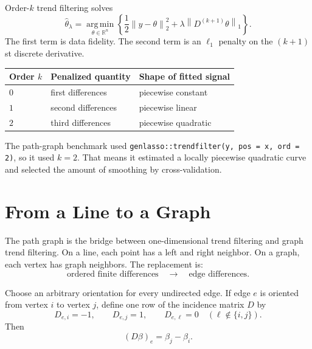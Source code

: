 \documentclass[11pt]{article}
\newcommand{\R}{\mathbb R}
\newcommand{\norm}[1]{\left\lVert #1 \right\rVert}
\newcommand{\argmin}{\operatorname*{arg\,min}}
\begin{document}
Order-\(k\) trend filtering solves
\[
  \widehat{\theta}_{\lambda}
  =
  \argmin_{\theta\in\R^n}
  \left\{
  \frac{1}{2}\norm{y-\theta}_2^2
  +
  \lambda\norm{D^{(k+1)}\theta}_1
  \right\}.
\]
The first term is data fidelity.  The second term is an \(\ell_1\) penalty on
the \((k+1)\)st discrete derivative.

\begin{center}
\begin{tabular}{lll}
\toprule
Order \(k\) & Penalized quantity & Shape of fitted signal\\
\midrule
\(0\) & first differences & piecewise constant\\
\(1\) & second differences & piecewise linear\\
\(2\) & third differences & piecewise quadratic\\
\bottomrule
\end{tabular}
\end{center}

The path-graph benchmark used \texttt{genlasso::trendfilter(y, pos = x, ord =
2)}, so it used \(k=2\).  That means it estimated a locally piecewise quadratic
curve and selected the amount of smoothing by cross-validation.

\section{From a Line to a Graph}

The path graph is the bridge between one-dimensional trend filtering and graph
trend filtering.  On a line, each point has a left and right neighbor.  On a
graph, each vertex has graph neighbors.  The replacement is:
\[
  \text{ordered finite differences}
  \quad\longrightarrow\quad
  \text{edge differences}.
\]

Choose an arbitrary orientation for every undirected edge.  If edge \(e\) is
oriented from vertex \(i\) to vertex \(j\), define one row of the incidence
matrix \(D\) by
\[
  D_{e,i}=-1,\qquad D_{e,j}=1,\qquad D_{e,\ell}=0
  \quad(\ell\notin\{i,j\}).
\]
Then
\[
  (D\beta)_e = \beta_j-\beta_i.
\]
\end{document}
